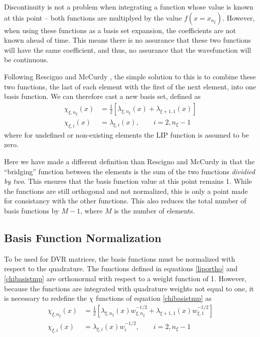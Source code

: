 \documentclass[preprint]{revtex4}
\begin{document}
Discontinuity is not a problem when integrating a function whose value is known at 
this point -- both functions are multiplyed by the value $f(x=x_{n_\xi})$. 
However, when using these functions as a basis set expansion, the coefficients
are not known ahead of time. This means there is no assurance that these two
functions will have the same coefficient, and thus, no assurance that the 
wavefunction will be continuous. 

Following Rescigno and McCurdy \cite{FEMDVR2000}, the simple solution to this
is to combine these two functions, the last of each element with the first
of the next element, into one basis function. We can therefore cast a new basis
set, defined as
\begin{align}
\label{chibasistmp}
\chi_{\xi,n_\xi}(x)&=\frac{1}{2}\left[\lambda_{\xi,n_\xi}(x)+\lambda_{\xi+1,1}(x)\right] \\
\chi_{\xi,i}(x)&=\lambda_{\xi,i}(x), \qquad i=2,n_\xi-1
\end{align}
where for undefined or non-existing elements the LIP function is assumed to be zero. 

Here we have made a different definition than Rescigno and McCurdy in that 
the ``bridging'' function between the elements is the sum of the two functions
{\it dividied by two}. This ensures that the basis function value at this point
remains 1. While the functions are still orthogonal and not normalized, this is 
only a point made for consistancy with the other functions.  This also reduces
the total number of basis functions by $M-1$, where $M$ is the number of 
elements. 

\subsection{Basis Function Normalization}
To be used for DVR matrices, the basis functions must be normalized with 
respect to the quadrature. The functions defined in equations \ref{liportho}
and \ref{chibasistmp} are orthonormal with respect to a weight function of 1. 
However, because the functions are integrated with quadrature weights not 
equal to one, it is necessary to redefine the $\chi$ functions of equation 
\ref{chibasistmp} as
\begin{align}
\label{chibasis}
\chi_{\xi,n_\xi}(x)&=\frac{1}{2}\left[\lambda_{\xi,n_\xi}(x)w_{\xi,n_\xi}^{-1/2}+\lambda_{\xi+1,1}(x)w_{\xi,1}^{-1/2}\right] \\
\chi_{\xi,i}(x)&=\lambda_{\xi,i}(x)w_i^{-1/2}, \qquad i=2,n_\xi-1
\end{align}
\end{document}
